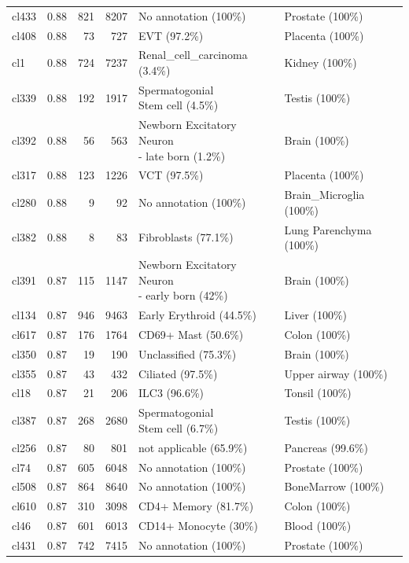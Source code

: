 \begin{table}[ht!]
\begin{tabular}{lrrrll}
  cl433 & 0.88 & 821 & 8207 & No annotation (100\%) & Prostate (100\%) \\ 
  cl408 & 0.88 &  73 & 727 & EVT (97.2\%) & Placenta (100\%) \\ 
  cl1 & 0.88 & 724 & 7237 & Renal\_cell\_carcinoma (3.4\%) & Kidney (100\%) \\ 
  cl339 & 0.88 & 192 & 1917 & \specialcell[t]{Spermatogonial\\Stem cell (4.5\%)} & Testis (100\%) \\ 
  cl392 & 0.88 &  56 & 563 & \specialcell[t]{Newborn Excitatory Neuron\\- late born (1.2\%)} & Brain (100\%) \\ 
  cl317 & 0.88 & 123 & 1226 & VCT (97.5\%) & Placenta (100\%) \\ 
  cl280 & 0.88 &   9 &  92 & No annotation (100\%) & Brain\_Microglia (100\%) \\ 
  cl382 & 0.88 &   8 &  83 & Fibroblasts (77.1\%) & Lung Parenchyma (100\%) \\ 
  cl391 & 0.87 & 115 & 1147 & \specialcell[t]{Newborn Excitatory Neuron\\- early born (42\%)} & Brain (100\%) \\ 
  cl134 & 0.87 & 946 & 9463 & Early Erythroid (44.5\%) & Liver (100\%) \\ 
  cl617 & 0.87 & 176 & 1764 & CD69+ Mast (50.6\%) & Colon (100\%) \\ 
  cl350 & 0.87 &  19 & 190 & Unclassified (75.3\%) & Brain (100\%) \\ 
  cl355 & 0.87 &  43 & 432 & Ciliated (97.5\%) & Upper airway (100\%) \\ 
  cl18 & 0.87 &  21 & 206 & ILC3 (96.6\%) & Tonsil (100\%) \\ 
  cl387 & 0.87 & 268 & 2680 & \specialcell[t]{Spermatogonial\\Stem cell (6.7\%)} & Testis (100\%) \\ 
  cl256 & 0.87 &  80 & 801 & not applicable (65.9\%) & Pancreas (99.6\%) \\ 
  cl74 & 0.87 & 605 & 6048 & No annotation (100\%) & Prostate (100\%) \\ 
  cl508 & 0.87 & 864 & 8640 & No annotation (100\%) & BoneMarrow (100\%) \\ 
  cl610 & 0.87 & 310 & 3098 & CD4+ Memory (81.7\%) & Colon (100\%) \\ 
  cl46 & 0.87 & 601 & 6013 & CD14+ Monocyte (30\%) & Blood (100\%) \\ 
  cl431 & 0.87 & 742 & 7415 & No annotation (100\%) & Prostate (100\%) \\ 

\end{tabular}
\end{table}

